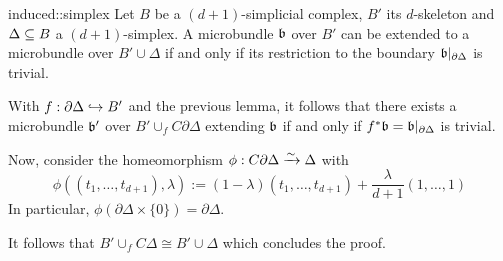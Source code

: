 \begin{mycorollary}{induced::simplex}
    Let $B$ be a $(d + 1)$-simplicial complex, $B'$ its $d$-skeleton and $\Delta \subseteq{} B$ a $(d + 1)$-simplex.
    A microbundle $\mathfrak{b}$ over $B'$ can be extended to a microbundle over $B' \cup \Delta$
    if and only if its restriction to the boundary $\mathfrak{b}\vert_{\partial \Delta}$ is trivial.
\end{mycorollary}

\begin{myproof}
    With $f: \partial \Delta \hookrightarrow{} B'$ and the previous lemma,
    it follows that there exists a microbundle $\mathfrak{b}'$ over $B' \cup_f C\partial\Delta$ extending $\mathfrak{b}$
    if and only if $f^*\mathfrak{b} = \mathfrak{b}\vert_{\partial\Delta}$ is trivial.

    Now, consider the homeomorphism $\phi: C\partial \Delta \xrightarrow{\sim} \Delta$ with
    \[ \phi((t_1, \dots, t_{d + 1}), \lambda) := (1 - \lambda) (t_1, \dots, t_{d + 1}) + \frac{\lambda}{d + 1} (1, \dots, 1) \]
    In particular, $\phi(\partial \Delta \times \{0\}) = \partial \Delta$.

    It follows that $B' \cup_f C\Delta \cong B' \cup \Delta$ which concludes the proof.
\end{myproof}